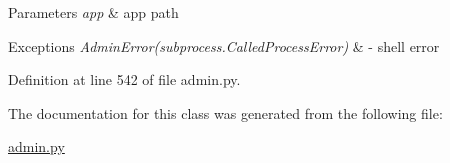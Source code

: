 \begin{DoxyParams}{Parameters}
{\em app} & app path \\
\hline
\end{DoxyParams}

\begin{DoxyExceptions}{Exceptions}
{\em Admin\-Error(subprocess.\-Called\-Process\-Error)} & -\/ shell error \\
\hline
\end{DoxyExceptions}


Definition at line 542 of file admin.\-py.



The documentation for this class was generated from the following file\-:\begin{DoxyCompactItemize}
\item 
\hyperlink{admin_8py}{admin.\-py}\end{DoxyCompactItemize}

